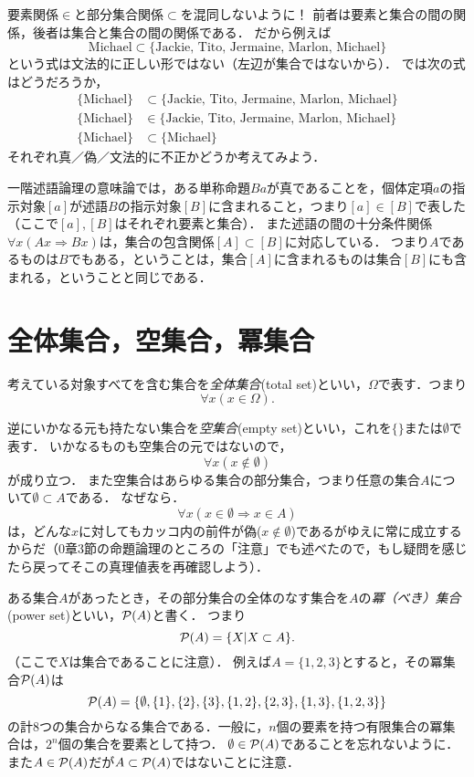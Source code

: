 \documentclass[11pt,a4paper]{jsarticle}
\begin{document}
\begin{attn}
要素関係$\in$と部分集合関係$\subset$を混同しないように！
前者は要素と集合の間の関係，後者は集合と集合の間の関係である．
だから例えば
\[
\text{Michael} \subset \{ \text{Jackie, Tito, Jermaine, Marlon, Michael}\}  
\]
という式は文法的に正しい形ではない（左辺が集合ではないから）．
では次の式はどうだろうか，
\begin{align*}
\{ \text{Michael} \} &\subset \{ \text{Jackie, Tito, Jermaine, Marlon, Michael}\}  \\
\{ \text{Michael} \} &\in \{ \text{Jackie, Tito, Jermaine, Marlon, Michael}\}  \\
\{ \text{Michael} \} &\subset \{ \text{Michael}\}   
\end{align*}
それぞれ真／偽／文法的に不正かどうか考えてみよう．
\end{attn}


\begin{example}
一階述語論理の意味論では，ある単称命題$Ba$が真であることを，個体定項$a$の指示対象$[a]$が述語$B$の指示対象$[B]$に含まれること，つまり$[a] \in [B]$で表した（ここで$[a], [B]$はそれぞれ要素と集合）．
また述語の間の十分条件関係$\forall x (Ax \Rightarrow Bx)$は，集合の包含関係$[A] \subset [B]$に対応している．
つまり$A$であるものは$B$でもある，ということは，集合$[A]$に含まれるものは集合$[B]$にも含まれる，ということと同じである．
\end{example}


\section{全体集合，空集合，冪集合}
考えている対象すべてを含む集合を\emph{全体集合}(total set)といい，$\Omega$で表す．つまり
\[
\forall x (x \in \Omega).
\]

逆にいかなる元も持たない集合を\emph{空集合}(empty set)といい，これを$\{\}$または$\emptyset$で表す．
いかなるものも空集合の元ではないので，
\[
\forall x (x \not\in \emptyset)
\]
が成り立つ．
また空集合はあらゆる集合の部分集合，つまり任意の集合$A$について$\emptyset \subset A$である．
なぜなら．
\[
\forall x (x \in \emptyset \Rightarrow x \in A)
\]
は，どんな$x$に対してもカッコ内の前件が偽($x \not\in \emptyset$)であるがゆえに常に成立するからだ（0章3節の命題論理のところの「注意」でも述べたので，もし疑問を感じたら戻ってそこの真理値表を再確認しよう）．

ある集合$A$があったとき，その部分集合の全体のなす集合を$A$の\emph{冪（べき）集合}(power set)といい，$\mathcal{P}(A)$と書く．
つまり
\[
 \mathcal{P}(A) = \{ X| X \subset A \}.
\]
（ここで$X$は集合であることに注意）．
例えば$A = \{1, 2, 3\}$とすると，その冪集合$\mathcal{P}(A)$は
\[
 \mathcal{P}(A) = \{ \emptyset, \{1\}, \{2\}, \{3\}, \{1,2\}, \{2,3\}, \{1,3\}, \{1,2,3\} \}
\]
の計8つの集合からなる集合である．一般に，$n$個の要素を持つ有限集合の冪集合は，$2^n$個の集合を要素として持つ．
$\emptyset \in \mathcal{P}(A)$であることを忘れないように．
また$A \in \mathcal{P}(A)$だが$A \subset \mathcal{P}(A)$ではないことに注意．
\end{document}

